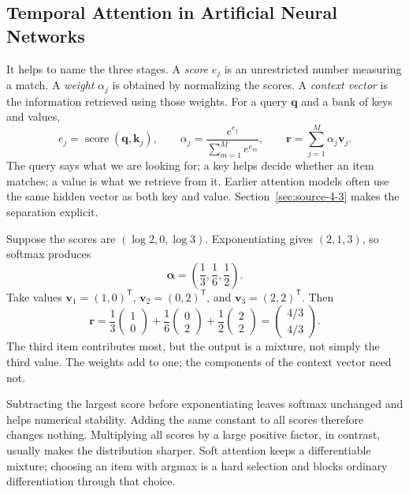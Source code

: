 \documentclass[11pt, oneside]{book}
\newcommand{\T}{^{\mathsf{T}}}           %
\let\originalsubsection\subsection
\renewcommand{\subsection}{\Needspace{6\baselineskip}\originalsubsection}
\begin{document}
\subsection{Temporal Attention in Artificial Neural Networks}\label{sec:source-4-1-3}
It helps to name the three stages. A \emph{score} $e_j$ is an unrestricted number measuring a match. A \emph{weight} $\alpha_j$ is obtained by normalizing the scores. A \emph{context vector} is the information retrieved using those weights. For a query $\mathbf{q}$ and a bank of keys and values,
\begin{equation}
 e_j=\operatorname{score}(\mathbf{q},\mathbf{k}_j),\qquad
 \alpha_j=\frac{e^{e_j}}{\sum_{m=1}^{M}e^{e_m}},\qquad
 \mathbf{r}=\sum_{j=1}^{M}\alpha_j\mathbf{v}_j.
 \label{eq:attention-recipe}
\end{equation}
The query says what we are looking for; a key helps decide whether an item matches; a value is what we retrieve from it. Earlier attention models often use the same hidden vector as both key and value. Section~\ref{sec:source-4-3} makes the separation explicit.

\begin{exbox}[title={Attention with three items: the entire calculation}]
Suppose the scores are $(\log2,0,\log3)$. Exponentiating gives $(2,1,3)$, so softmax produces
\[
 \boldsymbol{\alpha}=\left(\frac13,\frac16,\frac12\right).
\]
Take values $\mathbf{v}_1=(1,0)\T$, $\mathbf{v}_2=(0,2)\T$, and $\mathbf{v}_3=(2,2)\T$. Then
\[
 \mathbf{r}=\frac13\begin{pmatrix}1\\0\end{pmatrix}
            +\frac16\begin{pmatrix}0\\2\end{pmatrix}
            +\frac12\begin{pmatrix}2\\2\end{pmatrix}
          =\begin{pmatrix}4/3\\4/3\end{pmatrix}.
\]
The third item contributes most, but the output is a mixture, not simply the third value. The weights add to one; the components of the context vector need not.
\end{exbox}

Subtracting the largest score before exponentiating leaves softmax unchanged and helps numerical stability. Adding the same constant to all scores therefore changes nothing. Multiplying all scores by a large positive factor, in contrast, usually makes the distribution sharper. Soft attention keeps a differentiable mixture; choosing an item with argmax is a hard selection and blocks ordinary differentiation through that choice.
\end{document}
